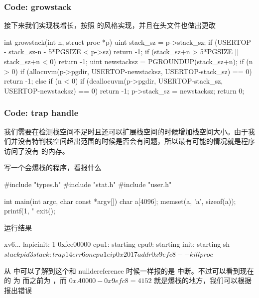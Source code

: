 \subsubsection{Code: growstack}

接下来我们实现栈增长，按照  的风格实现，并且在头文件也做出更改



\begin{ccode}
    int growstack(int n, struct proc *p) {
    uint stack_sz = p->stack_sz;
    if (USERTOP - stack_sz-n - 5*PGSIZE < p->sz)
        return -1;
    if (stack_sz+n > 5*PGSIZE || stack_sz+n < 0)
        return -1;
    uint newstacksz = PGROUNDUP(stack_sz+n);
    if (n > 0) {
        if (allocuvm(p->pgdir, USERTOP-newstacksz, USERTOP-stack_sz) == 0)
        return -1;
    } else if (n < 0) {
        if (deallocuvm(p->pgdir, USERTOP-stack_sz, USERTOP-newstacksz) == 0)
        return -1;
    }
    p->stack_sz = newstacksz;
    return 0;
    }
\end{ccode}

\subsubsection{Code: trap handle}
 
我们需要在检测栈空间不足时且还可以扩展栈空间的时候增加栈空间大小。由于我们并没有特判栈空间超出范围的时候是否会有问题，所以最有可能的情况就是程序访问了没有  的内存。

写一个会爆栈的程序，看报什么 


\begin{ccode}
    #include "types.h"
    #include "stat.h"
    #include "user.h"

    int main(int argc, char const *argv[])
    {
        char a[4096];
        memset(a, 'a', sizeof(a));
        printf(1, "%
        exit();
    }
\end{ccode}

运行结果

\begin{textcode}
    xv6...
    lapicinit: 1 0xfee00000
    cpu1: starting
    cpu0: starting
    init: starting sh
    $ stack
    pid 3 stack: trap 14 err 6 on cpu 1 eip 0x2017 addr 0x9efc8--kill proc
    $ 
\end{textcode}

从  中可以了解到这个和 nulldereference 时候一样报的是  中断。不过可以看到现在的  为  而之前为 ，而 $0xA0000-0x9efc8 = 4152$ 就是爆栈的地方，我们可以根据  报出错误

